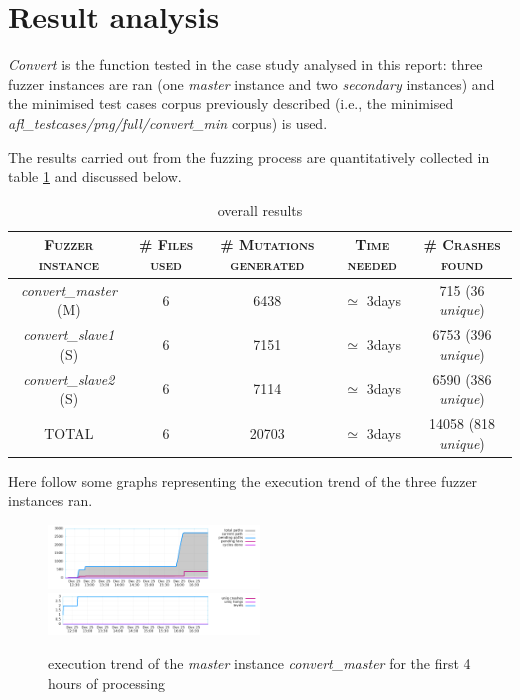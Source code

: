 \section{Result analysis}
\label{sec:res}

\textit{Convert} is the function tested in the case study analysed in this report: three fuzzer instances are ran (one \textit{master} instance and two \textit{secondary} instances) and the minimised test cases corpus previously described (i.e., the minimised \textit{afl\_testcases/png/full/convert\_min} corpus) is used.

The results carried out from the fuzzing process are quantitatively collected in table \ref{tab:convert_results} and discussed below.

\begin{table}[H]
    \centering
    \begin{tabular}{|c|c|c|c|c|}
        \hline
        \cellcolor{lightgray}\textsc{Fuzzer instance} & \cellcolor{lightgray}\textsc{\# Files used} & \cellcolor{lightgray}\textsc{\# Mutations generated} & \cellcolor{lightgray}\textsc{Time needed} & \cellcolor{lightgray}\textsc{\# Crashes found} \\
        \hline
        \textit{convert\_master} (M) & 6 & 6438 & $\simeq$ 3days & 715 (36 \textit{unique})\\
        \hline
        \textit{convert\_slave1} (S) & 6 & 7151 & $\simeq$ 3days & 6753 (396 \textit{unique}) \\
        \hline
        \textit{convert\_slave2} (S) & 6 & 7114 & $\simeq$ 3days & 6590 (386 \textit{unique}) \\
        \hline
        TOTAL & 6 & 20703 & $\simeq$ 3days & 14058 (818 \textit{unique}) \\
        \hline
    \end{tabular}
    \caption{overall results}
    \label{tab:convert_results}
\end{table}

Here follow some graphs representing the execution trend of the three fuzzer instances ran.

\begin{figure}[H]
    \centering
    \includegraphics[width=0.5\textwidth]{Resources/convert_master/high_freq.png}\hfill
    \includegraphics[width=0.5\textwidth]{Resources/convert_master/low_freq.png}
    \caption{execution trend of the \textit{master} instance \textit{convert\_master} for the first 4 hours of processing}
    \label{fig:convert_master}
\end{figure}

